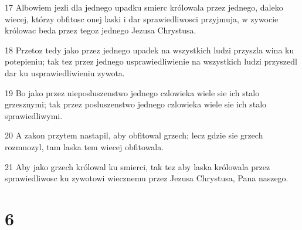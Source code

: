 \par 17 Albowiem jezli dla jednego upadku smierc królowala przez jednego, daleko wiecej, którzy obfitosc onej laski i dar sprawiedliwosci przyjmuja, w zywocie królowac beda przez tegoz jednego Jezusa Chrystusa.
\par 18 Przetoz tedy jako przez jednego upadek na wszystkich ludzi przyszla wina ku potepieniu; tak tez przez jednego usprawiedliwienie na wszystkich ludzi przyszedl dar ku usprawiedliwieniu zywota.
\par 19 Bo jako przez nieposluszenstwo jednego czlowieka wiele sie ich stalo grzesznymi; tak przez posluszenstwo jednego czlowieka wiele sie ich stalo sprawiedliwymi.
\par 20 A zakon przytem nastapil, aby obfitowal grzech; lecz gdzie sie grzech rozmnozyl, tam laska tem wiecej obfitowala.
\par 21 Aby jako grzech królowal ku smierci, tak tez aby laska królowala przez sprawiedliwosc ku zywotowi wiecznemu przez Jezusa Chrystusa, Pana naszego.

\chapter{6}

